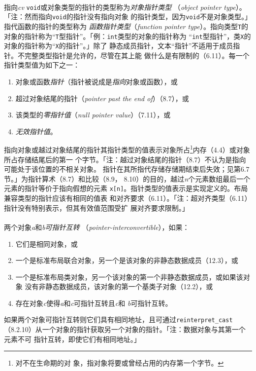 \paragraph{}
指向\textit{cv} \texttt{void}或对象类型的指针的类型称为\textit{对象指针类型}
（\textit{object pointer type}）。「注：然而指向\texttt{void}的指针没有指向对象
的指针类型，因为\texttt{void}不是对象类型。」指代函数的指针的类型称为
\textit{函数指针类型}（\textit{function pointer type}）。指向类型\texttt{T}的
对象的指针称为``\texttt{T}型指针''。「例：\texttt{int}类型的对象的指针称为
``\texttt{int}型指针''，类\texttt{X}的对象的指针称为``\texttt{X}的指针''。」除了
静态成员指针，文本``指针''不适用于成员指针。不完整类型指针是允许的，尽管在其上能
做什么是有限制的（6.11）。每一个指针类型值为如下之一：
\begin{enumerate}
  \item{对象或函数\textit{指针}（指针被说成是\textit{指向}对象或函数），或}
  \item{超过对象结尾的指针（\textit{pointer past the end of}）（8.7），或}
  \item{该类型的\textit{零指针值}（\textit{null pointer value}）（7.11），或}
  \item{\textit{无效指针值}。}
\end{enumerate}
指向对象或越过对象结尾的指针其指针类型的值表示对象所占\footnote{对不在生命期的对
象，指对象将要或曾经占用的内存第一个字节。}内存（4.4）或对象所占存储结尾后的第一
个字节。「注：越过对象结尾的指针（8.7）不认为是指向可能处于该位置的不相关对象。
指针在其所指代存储存储期结束后失效；见第6.7节。」为指针算术（8.7）和比较（8.9，
8.10）的目的，越过\textit{n}个元素数组最后一个元素的指针等价于指向假想的元素
\texttt{x[n]}。指针类型的值表示是实现定义的。布局兼容类型的指针应该有相同的值表
和对齐要求（6.11）。「注：超对齐类型（6.11）指针没有特别表示，但其有效值范围受扩
展对齐要求限制。」

\paragraph{}
两个对象\textit{a}和\textit{b}\textit{可指针互转}
（\textit{pointer-interconvertible}），如果：
\begin{enumerate}
  \item{它们是相同对象，或}
  \item{一个是标准布局联合对象，另一个是该对象的非静态数据成员（12.3），或}
  \item{一个是标准布局类对象，另一个该对象的第一个非静态数据成员，或如果该对象
    没有非静态数据成员，该对象的第一个基类子对象（12.2），或}
  \item{存在对象\textit{c}使得\textit{a}和\textit{c}可指针互转且\textit{c}和
    \textit{b}可指针互转。}
\end{enumerate}
如果两个对象可指针互转则它们具有相同地址，且可通过\texttt{reinterpret\_cast}
（8.2.10）从一个对象的指针获取另一个对象的指针。「注：数据对象与其第一个元素不可
指针互转，即使它们有相同地址。」

